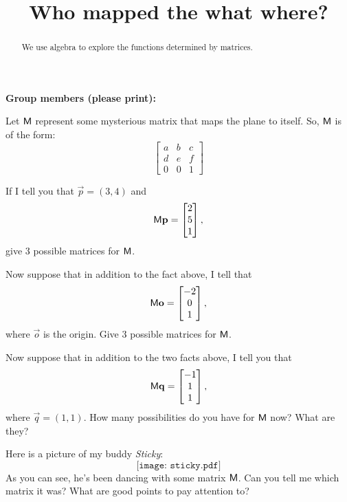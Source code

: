 \documentclass[noauthor,nooutcomes]{ximera}
\title{Who mapped the what where?}
\begin{document}
\begin{abstract}
We use algebra to explore the functions determined by matrices.
\end{abstract}
\maketitle

\noindent\textbf{Group members (please print):}\ \hrulefill \\

\hrulefill

Let $\mathsf{M}$ represent some mysterious matrix that maps the plane to itself.
So, $\mathsf{M}$ is of the form:
\[
\begin{bmatrix}
a & b & c \\
d & e & f \\
0 & 0 & 1
\end{bmatrix}
\]

\begin{problem} 
If I tell you that $\vec{p} = (3,4)$ and 
\[
\mathsf{M}\mathbf{p} = \begin{bmatrix}2\\ 5\\ 1\end{bmatrix},
\]
give $3$ possible matrices for $\mathsf{M}$.
\end{problem}

\begin{problem} 
Now suppose that in addition to the fact above, I tell that
\[
\mathsf{M}\mathbf{o} = \begin{bmatrix}-2\\ 0\\ 1\end{bmatrix},
\]
where $\vec{o}$ is the origin.  Give $3$ possible matrices for
$\mathsf{M}$.
\end{problem}


\begin{problem} 
Now suppose that in addition to the two facts above, I tell you that 
\[
\mathsf{M}\mathbf{q} = \begin{bmatrix}-1\\ 1\\ 1\end{bmatrix},
\]
where $\vec{q} = (1,1)$.  How many possibilities do you have for
$\mathsf{M}$ now? What are they?
\end{problem}

\begin{problem}
Here is a picture of my buddy \textit{Sticky}:
\[
\texttt{[image: sticky.pdf]}
\]
As you can see, he's been dancing with some matrix $\mathsf{M}$. Can you
tell me which matrix it was? What are good points to pay attention to?
\end{problem}
\end{document}
